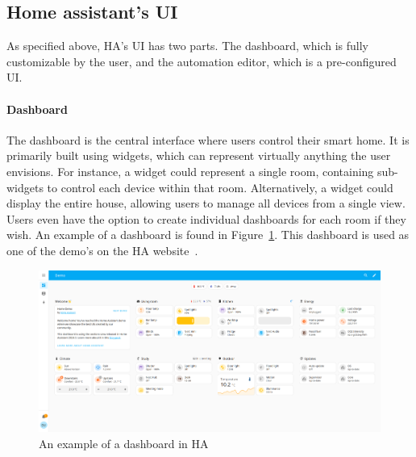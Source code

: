 \documentclass[11pt,a4paper]{report}
\begin{document}

\subsection{Home assistant's UI}
As specified above, HA's UI has two parts. The dashboard, which is fully customizable by the user, and the automation editor, which is a pre-configured UI.
\paragraph{Dashboard}
The dashboard is the central interface where users control their smart home. It is primarily built using widgets, which can represent virtually anything the user envisions. For instance, a widget could represent a single room, containing sub-widgets to control each device within that room. Alternatively, a widget could display the entire house, allowing users to manage all devices from a single view. Users even have the option to create individual dashboards for each room if they wish. An example of a dashboard is found in Figure~\ref{fig:ha_dashboard_ex}. This dashboard is used as one of the demo's on the HA website~\cite{HA_demo}.


\begin{figure}
    \centering
    \includegraphics[width=1\linewidth]{images/HA_dashboard_ex.png}
    \caption{An example of a dashboard in HA}
    \label{fig:ha_dashboard_ex}
\end{figure}
\end{document}

